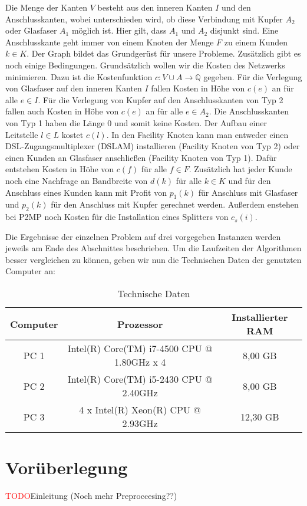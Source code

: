 \documentclass[11pt,a4paper]{article}
\newcommand{\Q}{\mathbb{Q}}
\newcommand{\TODO}{\textcolor{red}{TODO}}
\theoremstyle{my_th_style1}
\begin{document}
Die Menge der Kanten $V$ besteht aus den inneren Kanten $I$ und den Anschlusskanten, wobei unterschieden wird, ob diese Verbindung mit Kupfer $A_2$ oder Glasfaser $A_1$ möglich ist. Hier gilt, dass $A_1$ und $A_2$ disjunkt sind. 
Eine Anschlusskante geht immer von einem Knoten der Menge $F$ zu einem Kunden $k \in K$.
Der Graph bildet das Grundgerüst für unsere Probleme. Zusätzlich gibt es noch einige Bedingungen. Grundsätzlich wollen wir die Kosten des Netzwerks minimieren. 
Dazu ist die Kostenfunktion $c: V \cup A \rightarrow \Q$ gegeben.
Für die Verlegung von Glasfaser auf den inneren Kanten $I$ fallen Kosten in Höhe von $c(e)$ an für alle $e \in I$. 
Für die Verlegung von Kupfer auf den Anschlusskanten von Typ 2 fallen auch Kosten in Höhe von $c(e)$ an für alle $e \in A_2$. 
Die  Anschlusskanten von Typ 1 haben die Länge 0 und somit keine Kosten. Der Aufbau einer Leitstelle $ l\in L$ kostet $c(l)$. 
In den Facility Knoten kann man entweder einen DSL-Zugangsmultiplexer (DSLAM) installieren (Facility Knoten von Typ 2) oder einen Kunden an Glasfaser anschließen (Facility Knoten von Typ 1). Dafür entstehen Kosten in Höhe von $c(f)$ für alle $f \in F$.
Zusätzlich hat jeder Kunde noch eine Nachfrage an Bandbreite von $d(k)$ für alle $k \in K$ und für den Anschluss eines Kunden kann mit Profit von $p_1(k)$ für Anschluss mit Glasfaser und $p_2(k)$ für den Anschluss mit Kupfer gerechnet werden. Außerdem enstehen bei P2MP noch Kosten für die Installation eines Splitters von $c_s(i)$.

Die Ergebnisse der einzelnen Problem auf drei vorgegeben Instanzen werden jeweils am Ende des Abschnittes beschrieben.
Um die Laufzeiten der Algorithmen besser vergleichen zu können, geben wir nun die Technischen Daten der genutzten Computer an:
\begin{table}[h]
	\centering
	\begin{tabular}{|c|c|c|}
		\hline
		Computer & Prozessor & Installierter RAM \\	
		\hline
		PC 1 &Intel(R) Core(TM) i7-4500 CPU @ 1.80GHz x 4 & 8,00 GB\\
		PC 2 & Intel(R) Core(TM) i5-2430 CPU @ 2.40GHz & 8,00 GB \\
		PC 3 & 4 x Intel(R) Xeon(R) CPU @ 2.93GHz  & 12,30 GB\\
		\hline 
	\end{tabular}
	\caption{Technische Daten} 
\end{table}

\section{Vorüberlegung}
\label{preprocess}
\TODO Einleitung (Noch mehr Preproccesing??)
\end{document}
